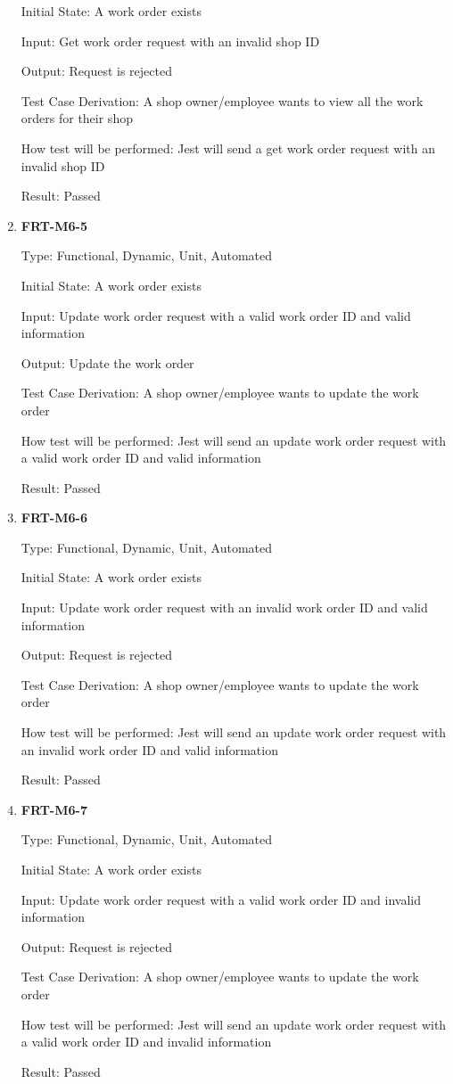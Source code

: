 \documentclass[12pt, titlepage]{article}
\begin{document}
\begin{enumerate}
	      Initial State: A work order exists

	      Input: Get work order request with an invalid shop ID

	      Output: Request is rejected

	      Test Case Derivation: A shop owner/employee wants to view all the work orders for their shop

	      How test will be performed: Jest will send a get work order request with an invalid shop ID

	      Result: Passed

	\item \textbf{FRT-M6-5}

	      Type: Functional, Dynamic, Unit, Automated

	      Initial State: A work order exists

	      Input: Update work order request with a valid work order ID and valid information

	      Output: Update the work order

	      Test Case Derivation: A shop owner/employee wants to update the work order

	      How test will be performed: Jest will send an update work order request with a valid work order ID
	      and valid information

	      Result: Passed

	\item \textbf{FRT-M6-6}

	      Type: Functional, Dynamic, Unit, Automated

	      Initial State: A work order exists

	      Input: Update work order request with an invalid work order ID and valid information

	      Output: Request is rejected

	      Test Case Derivation: A shop owner/employee wants to update the work order

	      How test will be performed: Jest will send an update work order request with an invalid work order
	      ID and valid information

	      Result: Passed

	\item \textbf{FRT-M6-7}

	      Type: Functional, Dynamic, Unit, Automated

	      Initial State: A work order exists

	      Input: Update work order request with a valid work order ID and invalid information

	      Output: Request is rejected

	      Test Case Derivation: A shop owner/employee wants to update the work order

	      How test will be performed: Jest will send an update work order request with a valid work order ID
	      and invalid information

	      Result: Passed

\end{enumerate}
\end{document}
